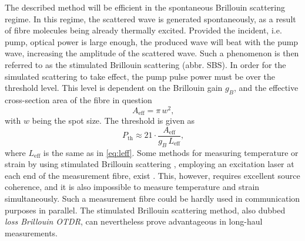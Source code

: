 \documentclass{standalone}
\begin{document}
The described method will be efficient in the spontaneous Brillouin scattering regime. In this regime, the scattered wave is generated spontaneously, as a result of fibre molecules being already thermally excited. Provided the incident, i.e. pump, optical power is large enough, the produced wave will beat with the pump wave, increasing the amplitude of the scattered wave. Such a phenomenon is then referred to as the stimulated Brillouin scattering (abbr. SBS). In order for the simulated scattering to take effect, the pump pulse power must be over the threshold level. This level is dependent on the Brillouin gain $g_B$, and the effective cross-section area of the fibre in question 
\begin{equation}
A_\textrm{eff} = \pi \, w^2 \textrm{,}
\end{equation}
with $w$ being the spot size. The threshold is given as
\begin{equation}
P_\textrm{th} \approx 21 \cdot \frac{A_\textrm{eff}}{g_B \, L_\textrm{eff}} \textrm{,}
\end{equation}
where $L_\textrm{eff}$ is the same as in \ref{eq:leff}. Some methods for measuring temperature or strain by using stimulated Brillouin scattering , employing an excitation laser at each end of the measurement fibre, exist %
. This, however, requires excellent source coherence, and it is also impossible to measure temperature and strain simultaneously. Such a measurement fibre could be hardly used in communication purposes in parallel. The stimulated Brillouin scattering method, also dubbed \textit{loss Brillouin OTDR}, can nevertheless prove advantageous in long-haul measurements.
\end{document}
